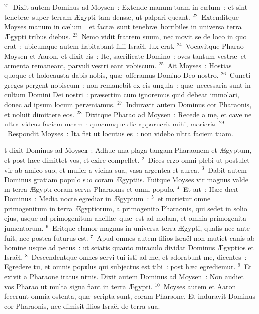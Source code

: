 ${}^{21}$~Dixit autem Dominus ad Moysen~: Extende manum tuam in c\ae lum~: et sint tenebr\ae\ super terram \AE gypti tam dens\ae , ut palpari queant.
${}^{22}$~Extenditque Moyses manum in c\ae lum~: et fact\ae\ sunt tenebr\ae\ horribiles in universa terra \AE gypti tribus diebus.
${}^{23}$~Nemo vidit fratrem suum, nec movit se de loco in quo erat~: ubicumque autem habitabant filii Isra\"el, lux erat.
${}^{24}$~Vocavitque Pharao Moysen et Aaron, et dixit eis~: Ite, sacrificate Domino~: oves tantum vestr\ae\ et armenta remaneant, parvuli vestri eant vobiscum.
${}^{25}$~Ait Moyses~: Hostias quoque et holocausta dabis nobis, qu\ae\ offeramus Domino Deo nostro.
${}^{26}$~Cuncti greges pergent nobiscum~; non remanebit ex eis ungula~: qu\ae\ necessaria sunt in cultum Domini Dei nostri~: pr\ae sertim cum ignoremus quid debeat immolari, donec ad ipsum locum perveniamus.
${}^{27}$~Induravit autem Dominus cor Pharaonis, et noluit dimittere eos.
${}^{28}$~Dixitque Pharao ad Moysen~: Recede a me, et cave ne ultra videas faciem meam~: quocumque die apparueris mihi, morieris.
${}^{29}$~Respondit Moyses~: Ita fiet ut locutus es~: non videbo ultra faciem tuam.

\bchapter
{}t dixit Dominus ad Moysen~: Adhuc una plaga tangam Pharaonem et \AE gyptum, et post h\ae c dimittet vos, et exire compellet.
${}^{2}$~Dices ergo omni plebi ut postulet vir ab amico suo, et mulier a vicina sua, vasa argentea et aurea.
${}^{3}$~Dabit autem Dominus gratiam populo suo coram \AE gyptiis. Fuitque Moyses vir magnus valde in terra \AE gypti coram servis Pharaonis et omni populo.
${}^{4}$~Et ait~: H\ae c dicit Dominus~: Media nocte egrediar in \AE gyptum~:
${}^{5}$~et morietur omne primogenitum in terra \AE gyptiorum, a primogenito Pharaonis, qui sedet in solio ejus, usque ad primogenitum ancill\ae\ qu\ae\ est ad molam, et omnia primogenita jumentorum.
${}^{6}$~Eritque clamor magnus in universa terra \AE gypti, qualis nec ante fuit, nec postea futurus est.
${}^{7}$~Apud omnes autem filios Isra\"el non mutiet canis ab homine usque ad pecus~: ut sciatis quanto miraculo dividat Dominus \AE gyptios et Isra\"el.
${}^{8}$~Descendentque omnes servi tui isti ad me, et adorabunt me, dicentes~: Egredere tu, et omnis populus qui subjectus est tibi~: post h\ae c egrediemur.
${}^{9}$~Et exivit a Pharaone iratus nimis. Dixit autem Dominus ad Moysen~: Non audiet vos Pharao ut multa signa fiant in terra \AE gypti.
${}^{10}$~Moyses autem et Aaron fecerunt omnia ostenta, qu\ae\ scripta sunt, coram Pharaone. Et induravit Dominus cor Pharaonis, nec dimisit filios Isra\"el de terra sua.

